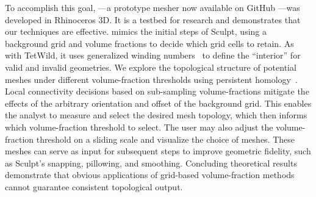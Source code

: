 To accomplish this goal, \briancode{}---a prototype mesher now available on GitHub \cite{tusqh_github:2025}---was developed in Rhinoceros 3D.
It is a testbed for research and demonstrates that our techniques are effective.
\briancode{} mimics the initial steps of Sculpt, using a background grid and volume fractions to decide which grid cells to retain.
As with TetWild, it uses generalized winding numbers~\cite{barill2018fast,Jacobson:2013}
to define the ``interior'' for valid and invalid geometries.
We explore the topological structure of potential meshes under different volume-fraction thresholds using persistent homology~\cite{Edelsbrunner:2002,Otter:2017}.
Local connectivity decisions based on sub-sampling volume-fractions mitigate the effects of the arbitrary orientation and offset of the background grid.
This enables the analyst to measure and select the desired mesh topology, which then informs which volume-fraction threshold to select. 
The user may also adjust the volume-fraction threshold on a sliding scale and visualize the choice of meshes. 
These meshes can serve as input for subsequent steps to improve geometric fidelity, such as Sculpt's snapping, pillowing, and smoothing.
Concluding theoretical results demonstrate that obvious applications of grid-based volume-fraction methods cannot guarantee consistent topological output.




